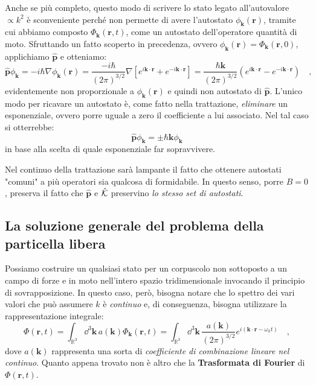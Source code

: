 \begin{approfondimento}[title={Non solo questione di comodità}]
    \noindent
    Anche se più completo, questo modo di scrivere lo stato legato all'autovalore $\propto k^2$ è sconveniente perché non permette di avere l'autostato $\phi_{\bm{k}}(\bm{r})$, tramite cui abbiamo composto $\Phi_{\bm{k}}(\bm{r},t)$, come un autostato dell'operatore quantità di moto. Sfruttando un fatto scoperto in precedenza, ovvero $\phi_{\bm{k}}(\bm{r}) = \Phi_{\bm{k}}(\bm{r}, 0)$, applichiamo $\hat{\bm{p}}$ e otteniamo:
    \[
        \hat{\bm{p}}\phi_{\bm{k}} = -i\hbar \nabla \phi_{\bm{k}}(\bm{r}) = \frac{-i\hbar}{(2\pi)^{3/2}} \nabla\left[ e^{i\bm{k} \cdot \bm{r}} + e^{-i\bm{k} \cdot \bm{r}}\right] = \frac{\hbar\bm{k} }{(2\pi)^{3/2}} \left(e^{i\bm{k} \cdot \bm{r}} - e^{-i\bm{k} \cdot \bm{r}} \right) \quad,
    \]
    evidentemente non proporzionale a $\phi_{\bm{k}}(\bm{r})$ e quindi non autostato di $\hat{\bm{p}}$. L'unico modo per ricavare un autostato è, come fatto nella trattazione, \emph{eliminare} un esponenziale, ovvero porre uguale a zero il coefficiente a lui associato. Nel tal caso si otterrebbe:
    \[
        \hat{\bm{p}}\phi_{\bm{k}} = \pm \hbar \bm{k}\phi_{\bm{k}} 
    \]
    in base alla scelta di quale esponenziale far sopravvivere. 

    Nel continuo della trattazione sarà lampante il fatto che ottenere autostati "comuni" a più operatori sia qualcosa di formidabile. In questo senso, porre $B = 0$, preserva il fatto che $\hat{\bm{p}}$ e $\hat{\mathcal{K}}$ preservino \emph{lo stesso set di autostati}.
\end{approfondimento}

\subsection{La soluzione generale del problema della particella libera}
Possiamo costruire un qualsiasi stato per un corpuscolo non sottoposto a un campo di forze e in moto nell'intero spazio tridimensionale invocando il principio di sovrapposizione. In questo caso, però, bisogna notare che lo spettro dei vari valori che può assumere $k$ è \emph{continuo} e, di conseguenza, bisogna utilizzare la rappresentazione integrale:
\begin{equation}
    \Phi(\bm{r}, t) = \int_{\mathbb{R}^3} \dd^3{\bm{k}} \, a(\bm{k})\Phi_{\bm{k}}(\bm{r},t) = \int_{\mathbb{R}^3} \dd^3{\bm{k}} \, \frac{a(\bm{k})}{(2\pi)^{3/2}} e^{i(\bm{k} \cdot \bm{r}-\omega_k t)} \quad,
    \label{eq:phi_four}
\end{equation}
dove $a(\bm{k})$ rappresenta una sorta di \emph{coefficiente di combinazione lineare nel continuo}. Quanto appena trovato non è altro che la \textbf{Trasformata di Fourier} di $\Phi(\bm{r}, t)$.

